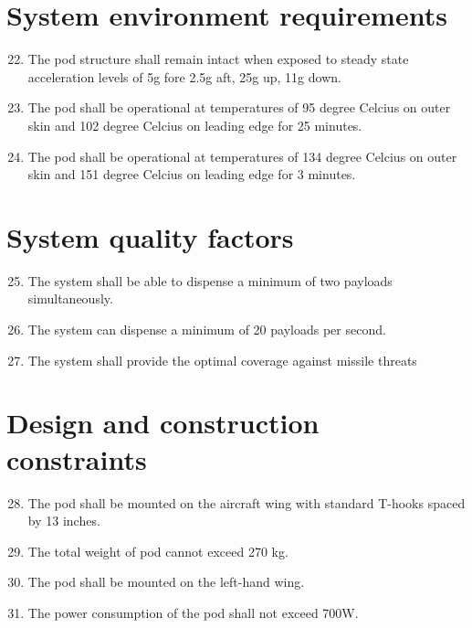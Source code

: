 \documentclass[Main]{subfiles}
\begin{document}
\section{System environment requirements}

\begin{enumerate}[{SR}-1]
\setcounter{enumi}{21}
\item The pod structure shall remain intact when exposed to steady state acceleration levels of 5g fore 2.5g aft, 25g up, 11g down.\label{SR-22}

\item The pod shall be operational at temperatures of 95 degree Celcius on outer skin and 102 degree Celcius on leading edge for 25 minutes.\label{SR-23}

\item The pod shall be operational at temperatures of 134 degree Celcius on outer skin and 151 degree Celcius on leading edge for 3 minutes.\label{SR-24}

\end{enumerate}



\section{System quality factors}

\begin{enumerate}[{SR}-1]
\setcounter{enumi}{24}
\item The system shall be able to dispense a minimum of two payloads simultaneously.\label{SR-25}

\item The system can dispense a minimum of 20 payloads per second.\label{SR-26}

\item The system shall provide the optimal coverage against
missile threats \label{SR-27}
\end{enumerate}

\section{Design and construction constraints}

\begin{enumerate}[{SR}-1]
\setcounter{enumi}{27}
\item The pod shall be mounted on the aircraft wing with standard T-hooks spaced by 13 inches.\label{SR-28}

\item The total weight of pod cannot exceed 270 kg.\label{SR-29}

\item The pod shall be mounted on the left-hand wing.\label{SR-30}

\item The power consumption of the pod shall not exceed 700W.\label{SR-31}
\end{enumerate}
\end{document}

